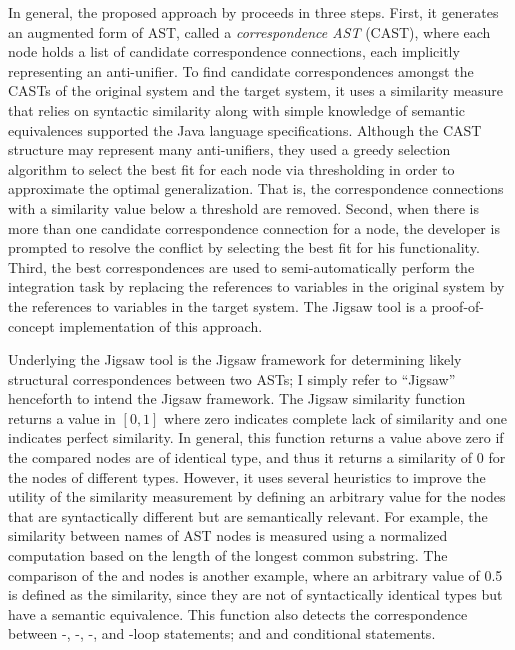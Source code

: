 In general, the proposed approach by \citeauthor{2008:fse:cottrell} proceeds in three steps. First, it generates an augmented form of AST, called a \emph{correspondence AST} (CAST), where each node holds a list of candidate correspondence connections, each implicitly representing an anti-unifier. To find candidate correspondences amongst the CASTs of the original system and the target system, it uses a similarity measure that relies on syntactic similarity along with simple knowledge of semantic equivalences supported the Java language specifications. Although the CAST structure may represent many anti-unifiers, they used a greedy selection algorithm to select the best fit for each node via thresholding in order to approximate the optimal generalization. That is, the correspondence connections with a similarity value below a threshold are removed. Second, when there is more than one candidate correspondence connection for a node, the developer is prompted to resolve the conflict by selecting the best fit for his functionality. Third, the best correspondences are used to semi-automatically perform the integration task by replacing the references to variables in the original system by the references to variables in the target system. The Jigsaw tool is a proof-of-concept implementation of this approach.

Underlying the Jigsaw tool is the Jigsaw framework for determining likely structural correspondences between two ASTs; I simply refer to ``Jigsaw'' henceforth to intend the Jigsaw framework.
The Jigsaw similarity function returns a value in $[0, 1]$ where zero indicates complete lack of similarity and one indicates perfect similarity. In general, this function returns a value above zero if the compared nodes are of identical type, and thus it returns a similarity of 0 for the nodes of different types. However, it uses several heuristics to improve the utility of the similarity measurement by defining an arbitrary value for the nodes that are syntactically different but are semantically relevant. For example, the similarity between names of AST nodes is measured using a normalized computation based on the length of the longest common substring. The comparison of the  and  nodes is another example, where an arbitrary value of 0.5 is defined as the similarity, since they are not of syntactically identical types but have a semantic equivalence. This function also detects the correspondence between -, -, -, and -loop statements; and  and  conditional statements.


